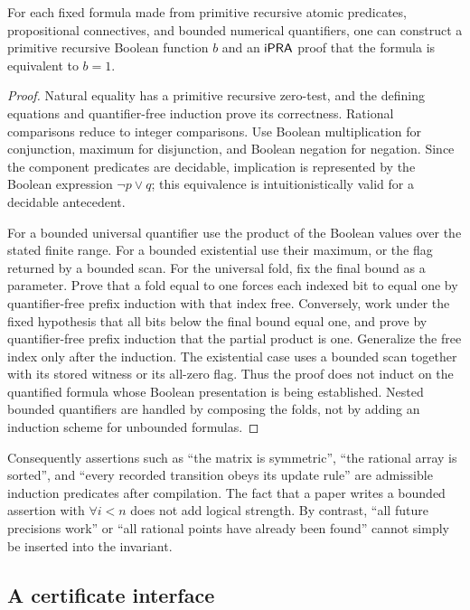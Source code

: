 \begin{lemma}
\label{lem:boolean}
For each fixed formula made from primitive recursive atomic predicates, propositional connectives, and bounded numerical quantifiers, one can construct a primitive recursive Boolean function $b$ and an $\mathsf{iPRA}$ proof that the formula is equivalent to $b=1$.
\end{lemma}
\begin{proof}
Natural equality has a primitive recursive zero-test, and the defining equations and quantifier-free induction prove its correctness. Rational comparisons reduce to integer comparisons. Use Boolean multiplication for conjunction, maximum for disjunction, and Boolean negation for negation. Since the component predicates are decidable, implication is represented by the Boolean expression $\neg p\lor q$; this equivalence is intuitionistically valid for a decidable antecedent.

For a bounded universal quantifier use the product of the Boolean values over the stated finite range. For a bounded existential use their maximum, or the flag returned by a bounded scan. For the universal fold, fix the final bound as a parameter. Prove that a fold equal to one forces each indexed bit to equal one by quantifier-free prefix induction with that index free. Conversely, work under the fixed hypothesis that all bits below the final bound equal one, and prove by quantifier-free prefix induction that the partial product is one. Generalize the free index only after the induction. The existential case uses a bounded scan together with its stored witness or its all-zero flag. Thus the proof does not induct on the quantified formula whose Boolean presentation is being established. Nested bounded quantifiers are handled by composing the folds, not by adding an induction scheme for unbounded formulas.
\end{proof}

Consequently assertions such as ``the matrix is symmetric'', ``the rational array is sorted'', and ``every recorded transition obeys its update rule'' are admissible induction predicates after compilation. The fact that a paper writes a bounded assertion with $\forall i<n$ does not add logical strength. By contrast, ``all future precisions work'' or ``all rational points have already been found'' cannot simply be inserted into the invariant.

\subsection{A certificate interface}

